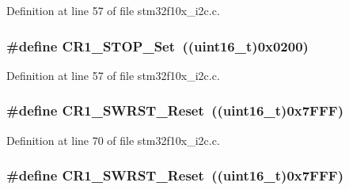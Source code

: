 Definition at line 57 of file stm32f10x\+\_\+i2c.\+c.

\subsubsection[{\texorpdfstring{C\+R1\+\_\+\+S\+T\+O\+P\+\_\+\+Set}{CR1_STOP_Set}}]{\setlength{\rightskip}{0pt plus 5cm}\#define C\+R1\+\_\+\+S\+T\+O\+P\+\_\+\+Set~(({\bf uint16\+\_\+t})0x0200)}\hypertarget{group___i2_c___private___defines_gac14ffc5548d2c30d21c49612c57e52be}{}\label{group___i2_c___private___defines_gac14ffc5548d2c30d21c49612c57e52be}


Definition at line 57 of file stm32f10x\+\_\+i2c.\+c.

\subsubsection[{\texorpdfstring{C\+R1\+\_\+\+S\+W\+R\+S\+T\+\_\+\+Reset}{CR1_SWRST_Reset}}]{\setlength{\rightskip}{0pt plus 5cm}\#define C\+R1\+\_\+\+S\+W\+R\+S\+T\+\_\+\+Reset~(({\bf uint16\+\_\+t})0x7\+F\+F\+F)}\hypertarget{group___i2_c___private___defines_gab41b615034ed8f830ef4900a0fcefc39}{}\label{group___i2_c___private___defines_gab41b615034ed8f830ef4900a0fcefc39}


Definition at line 70 of file stm32f10x\+\_\+i2c.\+c.

\subsubsection[{\texorpdfstring{C\+R1\+\_\+\+S\+W\+R\+S\+T\+\_\+\+Reset}{CR1_SWRST_Reset}}]{\setlength{\rightskip}{0pt plus 5cm}\#define C\+R1\+\_\+\+S\+W\+R\+S\+T\+\_\+\+Reset~(({\bf uint16\+\_\+t})0x7\+F\+F\+F)}\hypertarget{group___i2_c___private___defines_gab41b615034ed8f830ef4900a0fcefc39}{}\label{group___i2_c___private___defines_gab41b615034ed8f830ef4900a0fcefc39}


